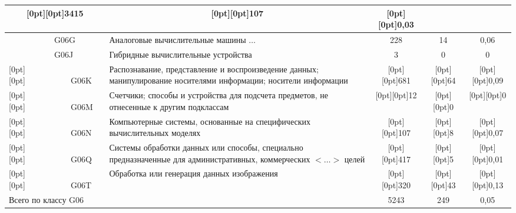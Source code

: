 \begin{multicols}{2}
\begin{table*}
\begin{center}
\begin{tabular}{|l|p{63mm}|c|c|c|}
\multicolumn{1}{c|}{\raisebox{-6pt}[0pt][0pt]{3415\hphantom{9}}}&
\multicolumn{1}{c|}{\raisebox{-6pt}[0pt][0pt]{107\hphantom{99}}}&
\multicolumn{1}{c|}{\raisebox{-6pt}[0pt][0pt]{0,03}}\\
\hline
\multicolumn{1}{|l|}{\ \ \ \ \ \ \ \ \ \ \ G06G}&Аналоговые вычислительные машины $\ldots$ &228&14\hphantom{9}&0,06\\
\hline
\multicolumn{1}{|l|}{\ \ \ \ \ \ \ \ \ \ \ G06J}&Гибридные вычислительные устройства&\hphantom{99}3&0&0\hphantom{,00}\\
\hline
\multicolumn{1}{|l|}{\raisebox{-12pt}[0pt][0pt]{\ \ \ \ \ \ \ \ \ \ \ G06K}}&
Распознавание, представление и воспроизведение данных;
манипулирование носителями информации; носители информации&
\multicolumn{1}{c|}{\raisebox{-12pt}[0pt][0pt]{681}}&
\multicolumn{1}{c|}{\raisebox{-12pt}[0pt][0pt]{64\hphantom{9}}}&
\multicolumn{1}{c|}{\raisebox{-12pt}[0pt][0pt]{0,09}}\\
\hline
\multicolumn{1}{|l|}{\raisebox{-12pt}[0pt][0pt]{\ \ \ \ \ \ \ \ \ \ \ G06M}}&
Счетчики; способы и устройства для подсчета предметов, не отнесенные
к другим подклассам&\multicolumn{1}{c|}{\raisebox{-12pt}[0pt][0pt]{\hphantom{9}12}}&
\multicolumn{1}{c|}{\raisebox{-12pt}[0pt][0pt]{0}}&
\multicolumn{1}{c|}{\raisebox{-12pt}[0pt][0pt]{0\hphantom{,00}}}\\
\hline
\multicolumn{1}{|l|}{\raisebox{-6pt}[0pt][0pt]{\ \ \ \ \ \ \ \ \ \ \ G06N}}&
Компьютерные системы, основанные на специфических вычислительных моделях&
\multicolumn{1}{c|}{\raisebox{-6pt}[0pt][0pt]{107}}&
\multicolumn{1}{c|}{\raisebox{-6pt}[0pt][0pt]{8}}&
\multicolumn{1}{c|}{\raisebox{-6pt}[0pt][0pt]{0,07}}\\
\hline
\multicolumn{1}{|l|}{\raisebox{-12pt}[0pt][0pt]{\ \ \ \ \ \ \ \ \ \ \ G06Q}}&Системы обработки данных или способы,
специально предназначенные для административных, коммерческих $<\ldots>$ целей&
\multicolumn{1}{c|}{\raisebox{-12pt}[0pt][0pt]{417}}&
\multicolumn{1}{c|}{\raisebox{-12pt}[0pt][0pt]{5}}&
\multicolumn{1}{c|}{\raisebox{-12pt}[0pt][0pt]{0,01}}\\
\hline
\multicolumn{1}{|l|}{\raisebox{-6pt}[0pt][0pt]{\ \ \ \ \ \ \ \ \ \ \ G06T}}&
Обработка или генерация данных изображения&
\multicolumn{1}{c|}{\raisebox{-6pt}[0pt][0pt]{320}}&
\multicolumn{1}{c|}{\raisebox{-6pt}[0pt][0pt]{43\hphantom{9}}}&
\multicolumn{1}{c|}{\raisebox{-6pt}[0pt][0pt]{0,13}}\\
\hline
Всего по классу G06&&5243\hphantom{9}&249\hphantom{9}&0,05\\
     \hline
     \end{tabular}
     \end{center}
     \end{table*}


\end{multicols}
